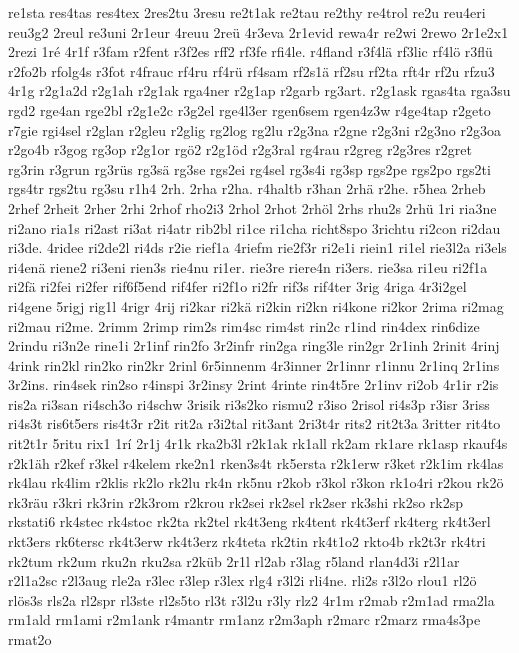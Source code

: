 {re1sta
res4tas
res4tex
2res2tu
3resu
re2t1ak
re2tau
re2thy
re4trol
re2u
reu4eri
reu3g2
2reul
re3uni
2r1eur
4reuu
2reü
4r3eva
2r1evid
rewa4r
re2wi
2rewo
2r1e2x1
2rezi
1ré
4r1f
r3fam
r2fent
r3f2es
rff2
rf3fe
rfi4le.
r4fland
r3f4lä
rf3lic
rf4lö
r3flü
r2fo2b
rfolg4s
r3fot
r4frauc
rf4ru
rf4rü
rf4sam
rf2s1ä
rf2su
rf2ta
rft4r
rf2u
rfzu3
4r1g
r2g1a2d
r2g1ah
r2g1ak
rga4ner
r2g1ap
r2garb
rg3art.
r2g1ask
rgas4ta
rga3su
rgd2
rge4an
rge2bl
r2g1e2c
r3g2el
rge4l3er
rgen6sem
rgen4z3w
r4ge4tap
r2geto
r7gie
rgi4sel
r2glan
r2gleu
r2glig
rg2log
rg2lu
r2g3na
r2gne
r2g3ni
r2g3no
r2g3oa
r2go4b
r3gog
rg3op
r2g1or
rgö2
r2g1öd
r2g3ral
rg4rau
r2greg
r2g3res
r2gret
rg3rin
r3grun
rg3rüs
rg3sä
rg3se
rgs2ei
rg4sel
rg3s4i
rg3sp
rgs2pe
rgs2po
rgs2ti
rgs4tr
rgs2tu
rg3su
r1h4
2rh.
2rha
r2ha.
r4haltb
r3han
2rhä
r2he.
r5hea
2rheb
2rhef
2rheit
2rher
2rhi
2rhof
rho2i3
2rhol
2rhot
2rhöl
2rhs
rhu2s
2rhü
1ri
ria3ne
ri2ano
ria1s
ri2ast
ri3at
ri4atr
rib2bl
ri1ce
ri1cha
richt8spo
3richtu
ri2con
ri2dau
ri3de.
4ridee
ri2de2l
ri4ds
r2ie
rief1a
4riefm
rie2f3r
ri2e1i
riein1
ri1el
rie3l2a
ri3els
ri4enä
riene2
ri3eni
rien3s
rie4nu
ri1er.
rie3re
riere4n
ri3ers.
rie3sa
ri1eu
ri2f1a
ri2fä
ri2fei
ri2fer
rif6f5end
rif4fer
ri2f1o
ri2fr
rif3s
rif4ter
3rig
4riga
4r3i2gel
ri4gene
5rigj
rig1l
4rigr
4rij
ri2kar
ri2kä
ri2kin
ri2kn
ri4kone
ri2kor
2rima
ri2mag
ri2mau
ri2me.
2rimm
2rimp
rim2s
rim4sc
rim4st
rin2c
r1ind
rin4dex
rin6dize
2rindu
ri3n2e
rine1i
2r1inf
rin2fo
3r2infr
rin2ga
ring3le
rin2gr
2r1inh
2rinit
4rinj
4rink
rin2kl
rin2ko
rin2kr
2rinl
6r5innenm
4r3inner
2r1innr
r1innu
2r1inq
2r1ins
3r2ins.
rin4sek
rin2so
r4inspi
3r2insy
2rint
4rinte
rin4t5re
2r1inv
ri2ob
4r1ir
r2is
ris2a
ri3san
ri4sch3o
ri4schw
3risik
ri3s2ko
rismu2
r3iso
2risol
ri4s3p
r3isr
3riss
ri4s3t
ris6t5ers
ris4t3r
r2it
rit2a
r3i2tal
rit3ant
2ri3t4r
rits2
rit2t3a
3ritter
rit4to
rit2t1r
5ritu
rix1
1rí
2r1j
4r1k
rka2b3l
r2k1ak
rk1all
rk2am
rk1are
rk1asp
rkauf4s
r2k1äh
r2kef
r3kel
r4kelem
rke2n1
rken3s4t
rk5ersta
r2k1erw
r3ket
r2k1im
rk4las
rk4lau
rk4lim
r2klis
rk2lo
rk2lu
rk4n
rk5nu
r2kob
r3kol
r3kon
rk1o4ri
r2kou
rk2ö
rk3räu
r3kri
rk3rin
r2k3rom
r2krou
rk2sei
rk2sel
rk2ser
rk3shi
rk2so
rk2sp
rkstati6
rk4stec
rk4stoc
rk2ta
rk2tel
rk4t3eng
rk4tent
rk4t3erf
rk4terg
rk4t3erl
rkt3ers
rk6tersc
rk4t3erw
rk4t3erz
rk4teta
rk2tin
rk4t1o2
rkto4b
rk2t3r
rk4tri
rk2tum
rk2um
rku2n
rku2sa
r2küb
2r1l
rl2ab
r3lag
r5land
rlan4d3i
r2l1ar
r2l1a2sc
r2l3aug
rle2a
r3lec
r3lep
r3lex
rlg4
r3l2i
rli4ne.
rli2s
r3l2o
rlou1
rl2ö
rlös3s
rls2a
rl2spr
rl3ste
rl2s5to
rl3t
r3l2u
r3ly
rlz2
4r1m
r2mab
r2m1ad
rma2la
rm1ald
rm1ami
r2m1ank
r4mantr
rm1anz
r2m3aph
r2marc
r2marz
rma4s3pe
rmat2o
}
